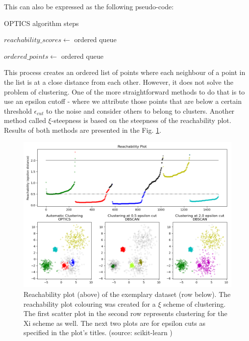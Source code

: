 This can also be expressed as the following pseudo-code:

\begin{algorithm}[ht]
\caption{OPTICS algorithm steps}\label{alg:optics}
$reachability\_scores \gets$ ordered queue

$ordered\_points \gets $ ordered queue

\end{algorithm}

This process creates an ordered list of points where each neighbour of a point in the list is at a close distance from each other.
However, it does not solve the problem of clustering.
One of the more straightforward methods to do that is to use an epsilon cutoff - where we attribute those points that are below a certain threshold $\epsilon_{cut}$ to the noise and consider others to belong to clusters.
Another method called $\xi$-steepness is based on the steepness of the reachability plot.
Results of both methods are presented in the Fig. \ref{fig:optics}.



\begin{figure}
  \centering
  \includegraphics[width=0.9\linewidth]{figures/chapter3/sphx_glr_plot_optics_001.png}
  \caption{Reachability plot (above) of the exemplary dataset (row below). The reachability plot colouring was created for a $\xi$ \cite{10.1145/304182.304187} scheme of clustering. The first scatter plot in the second  row represents clustering for the Xi scheme as well. The next two plots are for epsilon cuts as specified in the plot's titles. (source: scikit-learn \cite{scikit-learn})}
  \label{fig:optics}
\end{figure}


